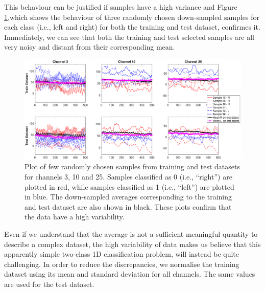 \documentclass{article}
\begin{document}
 This behaviour can be justified if  samples have a high variance and Figure \ref{fig_fewsamples_vs_mean_downsampled},which shows the behaviour of three randomly chosen down-sampled samples for each class (i.e., left and right) for both the training and test dataset, confirmes it. 
 Immediately, we can see that both the training and test selected samples are all very noisy and distant from their corresponding mean.
  \begin{figure}[h]
 \begin{center}
  \includegraphics[width=1\textwidth]{fig/fig5new_fewsamples_mean_downsampled} 
  \caption{Plot of few randomly chosen samples from training and test datasets for channels 3, 10 and 25.
  Samples classified as 0 (i.e., ``right'') are plotted in red, while   samples classified as 1 (i.e., ``left'') are plotted in blue.
  The down-sampled averages corresponding to the training and test dataset are also shown in black.
   These plots confirm that the data have a high variability. 
  \label{fig_fewsamples_vs_mean_downsampled}}
  \end{center}
  \end{figure}
  
 Even if we understand that the average is not a sufficient meaningful quantity to describe a complex dataset, the high variability of data makes us believe that this apparently simple two-class 1D classification problem, will instead be quite challenging. 
  In order to reduce the discrepancies, we  normalise the training dataset using its mean and standard deviation for all channels. 
  The same values are used for the test dataset. 
  
\end{document}
